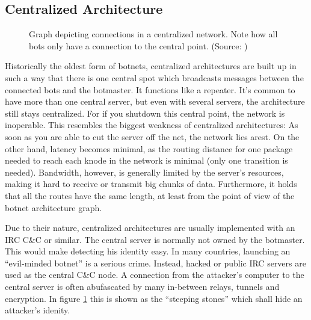 \documentclass{llncs}
\begin{document}
\subsection{Centralized Architecture}
%
%
\begin{figure}[htbp]
  \centering
  \caption{Graph depicting connections in a centralized network. Note
    how all bots only have a connection to the central point. (Source:
    \cite{dittrich2007command})}
  \label{central-network}
\end{figure}
Historically the oldest form of botnets, centralized architectures are
built up in such a way that there is one central spot which broadcasts
messages between the connected bots and the botmaster. It functions
like a repeater. It's common to have more than one central
server\cite{td1sc}, but even with several servers, the architecture
still stays centralized. For if you shutdown this central point, the
network is inoperable. This resembles the biggest weakness of
centralized architectures: As soon as you are able to cut the server
off the net, the network lies arest. On the other hand, latency
becomes minimal, as the routing distance for one package needed to
reach each knode in the network is minimal (only one transition is
needed). Bandwidth, however, is generally limited by the server's
resources, making it hard to receive or transmit big chunks of
data. Furthermore, it holds that all the routes have the same length,
at least from the point of view of the botnet architecture graph.

Due to their nature, centralized architectures are usually implemented
with an IRC C\&C or similar\cite{cooke2005zombie}. The central server
is normally not owned by the botmaster. This would make detecting his
identity easy. In many countries, launching an ``evil-minded botnet''
is a serious crime. Instead, hacked or public IRC servers are used as
the central C\&C node. A connection from the attacker's computer to
the central server is often abufascated by many in-between relays,
tunnels and encryption. In figure
\ref{central-network} this is shown as the ``steeping stones'' which
shall hide an attacker's idenity.
\end{document}
